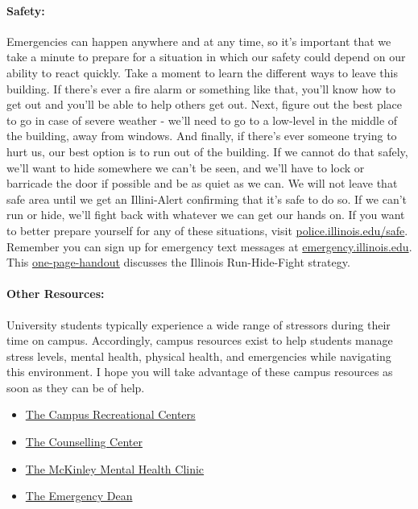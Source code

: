 \documentclass[11pt]{article}
\begin{document}
\paragraph{Safety:}
Emergencies can happen anywhere and at any time, so it’s important that we take
a minute to prepare for a situation in which our safety could depend on our
ability to react quickly. Take a moment to learn the different ways to leave
this building. If there’s ever a fire alarm or something like that, you’ll know
how to get out and you’ll be able to help others get out. Next, figure out the
best place to go in case of severe weather - we’ll need to go to a low-level in
the middle of the building, away from windows. And finally, if there’s ever
someone trying to hurt us, our best option is to run out of the building. If we
cannot do that safely, we’ll want to hide somewhere we can’t be seen, and we’ll
have to lock or barricade the door if possible and be as quiet as we can. We
will not leave that safe area until we get an Illini-Alert confirming that it’s
safe to do so. If we can’t run or hide, we’ll fight back with whatever we can
get our hands on. If you want to better prepare yourself for any of these
situations, visit \url{police.illinois.edu/safe}. Remember you can sign up for
emergency text messages at \url{emergency.illinois.edu}. This
\href{http://police.illinois.edu/dpsapp/wp-content/uploads/2017/08/syllabus-attachment.pdf}{one-page-handout}
discusses the Illinois Run-Hide-Fight strategy.


\paragraph{Other Resources:}
University students typically experience a wide range of stressors during their
time on campus. Accordingly, campus resources exist to help students manage
stress levels, mental health, physical health, and emergencies while navigating
this environment. I hope you will take advantage of these campus resources as
soon as they can be of help.

\begin{itemize}
\item \href{https://campusrec.illinois.edu/}{The Campus Recreational Centers}
\item \href{http://counselingcenter.illinois.edu/}{The Counselling Center}
\item \href{http://www.mckinley.illinois.edu/clinics/mental\_health.htm}{The McKinley Mental Health Clinic}
\item \href{http://odos.illinois.edu/emergency/}{The Emergency Dean}
\end{itemize}
\end{document}
